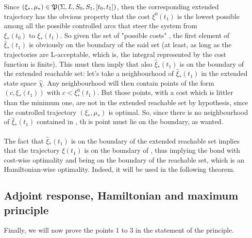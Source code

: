  Since $(\xi_*,\mu_*)\in\mathfrak{P}(\Sigma,L,S_0,S_1,[t_0,t_1])$, then the corresponding extended trajectory has the obvious property that the cost $\xi^0(t_1)$ is the lowest possible among all the possible controlled arcs \controlledTraj that steer the system from $\xi_*(t_0)\text{ to }\xi_*(t_1)$. So given the set of "possible costs" , the first element of $\hat{\xi}_*(t_1)$ is obviously on the boundary of the said set (at least, as long as the trajectories are L-acceptable, which is, the integral represented by the cost function is finite). This must then imply that also $\hat{\xi}_*(t_1)$ is on the boundary of the extended reachable set: let's take a neighbourhood of $\hat{\xi}_*(t_1)$ in the extended state space $\hat{\chi}$. Any neighbourhood will then contain points of the form $(c,\xi_*(t_1))$ with $c<\xi_*^0(t_1)$. But those points, with a cost which is littler than the minimum one, are not in the extended reachable set by hypothesis, since the controlled trajectory  $(\xi_*,\mu_*)$ is optimal. So, since there is no neighbourhood of $\hat{\xi}_*(t_1)$ contained in , th
is point must lie on the boundary, as wanted.\\\\


The fact that $\hat{\xi}_*(t_1)$ is on the boundary of the extended reachable set implies that the trajectory $\xi(t_1)$ is on the boundary of , thus implying the bond with cost-wise optimality and being on the boundary of the reachable set, which is an Hamiltonian-wise optimality. Indeed, it will be used in the following theorem.


\subsection[6.3]{Adjoint response, Hamiltonian and maximum principle}
Finally, we will now prove the points 1 to 3 in the statement of the principle. 

